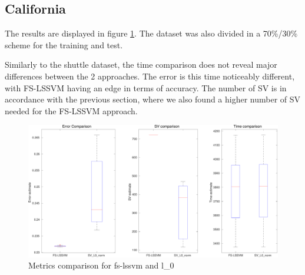 \documentclass[11pt, a4paper]{article}
\begin{document}
\subsection{California}

The results are displayed in figure \ref{fig:fslssvm_california}. The
dataset was also divided in a 70\%/30\% scheme for the training and
test.

Similarly to the shuttle dataset, the time comparison does not reveal
major differences between the 2 approaches. The error is this time
noticeably different, with FS-LSSVM having an edge in terms of
accuracy. The number of SV is in accordance with the previous section,
where we also found a higher number of SV needed for the FS-LSSVM
approach.

\begin{figure}[H]
  \centering
  \includegraphics[scale=.36]{fslssvm_california.pdf}
  \caption{Metrics comparison for fs-lssvm and l\_0}
  \label{fig:fslssvm_california}
\end{figure}
\end{document}
